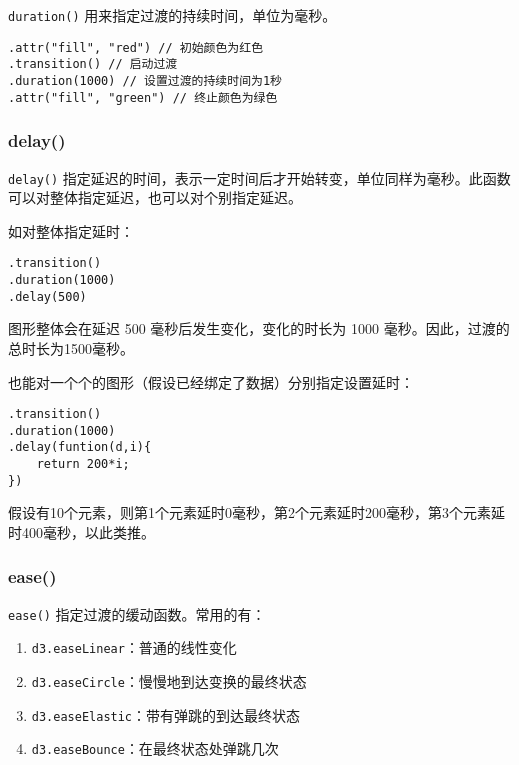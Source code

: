 \verb|duration()| 用来指定过渡的持续时间，单位为毫秒。

\begin{verbatim}
.attr("fill", "red") // 初始颜色为红色
.transition() // 启动过渡
.duration(1000) // 设置过渡的持续时间为1秒
.attr("fill", "green") // 终止颜色为绿色
\end{verbatim}

\subsubsection{delay()}

\verb|delay()| 指定延迟的时间，表示一定时间后才开始转变，单位同样为毫秒。此函数可以对整体指定延迟，也可以对个别指定延迟。

如对整体指定延时：

\begin{verbatim}
.transition()
.duration(1000)
.delay(500)
\end{verbatim}

图形整体会在延迟 500 毫秒后发生变化，变化的时长为 1000 毫秒。因此，过渡的总时长为1500毫秒。

也能对一个个的图形（假设已经绑定了数据）分别指定设置延时：

\begin{verbatim}
.transition()
.duration(1000)
.delay(funtion(d,i){
    return 200*i;
})
\end{verbatim}

假设有10个元素，则第1个元素延时0毫秒，第2个元素延时200毫秒，第3个元素延时400毫秒，以此类推。

\subsubsection{ease()}

\verb|ease()| 指定过渡的缓动函数。常用的有：

\begin{enumerate}
    \item \verb|d3.easeLinear|：普通的线性变化
    \item \verb|d3.easeCircle|：慢慢地到达变换的最终状态
    \item \verb|d3.easeElastic|：带有弹跳的到达最终状态
    \item \verb|d3.easeBounce|：在最终状态处弹跳几次
\end{enumerate}


